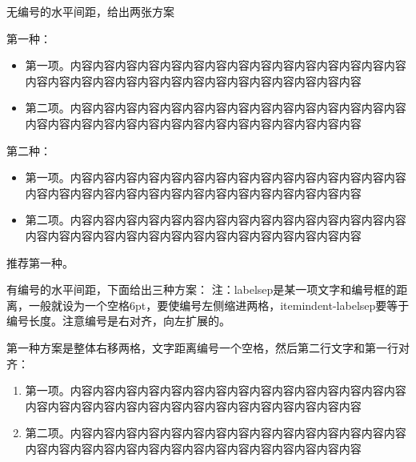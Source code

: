 无编号的水平间距，给出两张方案
 
第一种：
\begin{itemize}[topsep = 0 pt, itemsep= 0 pt, parsep=0pt, partopsep=0pt, leftmargin=36pt, itemindent=0pt, labelsep=6pt, listparindent=24pt]
	\item 第一项。内容内容内容内容内容内容内容内容内容内容内容内容内容内容内容内容内容内容内容内容内容内容内容内容内容内容内容内容内容内容

	\item 第二项。内容内容内容内容内容内容内容内容内容内容内容内容内容内容内容内容内容内容内容内容内容内容内容内容内容内容内容内容内容内容
	
\end{itemize}


第二种：
\begin{itemize}[topsep = 0 pt, itemsep= 0 pt, parsep=0pt, partopsep=0pt, leftmargin=0pt, itemindent=36pt, labelsep=6pt, listparindent=24pt]
	\item 第一项。内容内容内容内容内容内容内容内容内容内容内容内容内容内容内容内容内容内容内容内容内容内容内容内容内容内容内容内容内容内容

	\item 第二项。内容内容内容内容内容内容内容内容内容内容内容内容内容内容内容内容内容内容内容内容内容内容内容内容内容内容内容内容内容内容
	
\end{itemize}

推荐第一种。

有编号的水平间距，下面给出三种方案：
注：labelsep是某一项文字和编号框的距离，一般就设为一个空格6pt，要使编号左侧缩进两格，itemindent-labelsep要等于编号长度。注意编号是右对齐，向左扩展的。

第一种方案是整体右移两格，文字距离编号一个空格，然后第二行文字和第一行对齐：
\begin{enumerate}[topsep = 0 pt, itemsep= 0 pt, parsep=0pt, partopsep=0pt, leftmargin=44pt, itemindent=0pt, labelsep=6pt, label=(\arabic*)]
	\item 第一项。内容内容内容内容内容内容内容内容内容内容内容内容内容内容内容内容内容内容内容内容内容内容内容内容内容内容内容内容内容内容

	\item 第二项。内容内容内容内容内容内容内容内容内容内容内容内容内容内容内容内容内容内容内容内容内容内容内容内容内容内容内容内容内容内容
	
\end{enumerate}


